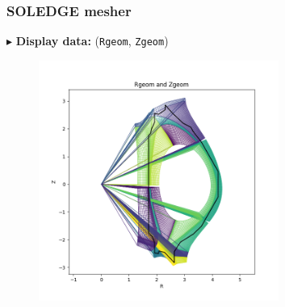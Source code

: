 \documentclass[t,10pt,a3paper]{beamer} %
\newenvironment{changemargin}[2]{%
 \begin{list}{}{%
     \setlength{\topsep}{0pt}%
     \setlength{\leftmargin}{#1}%
     \setlength{\rightmargin}{#2}%
     \setlength{\listparindent}{\parindent}%
     \setlength{\itemindent}{\parindent}%
     \setlength{\parsep}{\parskip}%
   }%
\item[]}{\end{list}}
\begin{document}
\begin{frame} %
\frametitle{\color{vert}\textbf{SOLEDGE mesher}}
\footnotesize	

{\color{vert}$\blacktriangleright$ }
\textbf{Display data:} (\verb|Rgeom|, \verb|Zgeom|)
\begin{changemargin}{-2cm}{-2cm} 
\begin{center}
\begin{figure}[!h]
	\includegraphics[width=0.7\textwidth]{images/Rgeom_and_Zgeom.png}
\end{figure}	
\end{center}
\end{changemargin}

\end{frame}
\end{document}
